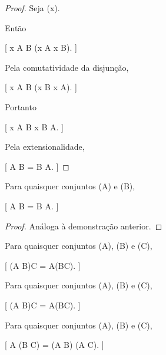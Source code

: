 \documentclass[../../main]{subfiles}
\begin{document}
\begin{proof}

	Seja (x).

	Então

	[
	x \in A \cup B
	\Leftrightarrow
	(x \in A \lor x \in B).
	]

	Pela comutatividade da disjunção,

	[
			x \in A \cup B
			\Leftrightarrow
			(x \in B \lor x \in A).
		]

	Portanto

		[
			x \in A \cup B
			\Leftrightarrow
			x \in B \cup A.
		]

	Pela extensionalidade,

	[
			A \cup B = B \cup A.
		]

\end{proof}

\begin{prop}

	Para quaisquer conjuntos (A) e (B),

	[
			A \cap B = B \cap A.
		]

\end{prop}

\begin{proof}

	Análoga à demonstração anterior.

\end{proof}

\begin{prop}

	Para quaisquer conjuntos (A), (B) e (C),

	[
			(A \cup B)\cup C
			=
			A\cup(B\cup C).
		]

\end{prop}

\begin{prop}

	Para quaisquer conjuntos (A), (B) e (C),

	[
			(A \cap B)\cap C
			=
			A\cap(B\cap C).
		]

\end{prop}

\begin{prop}

	Para quaisquer conjuntos (A), (B) e (C),

	[
			A \cup (B \cap C)
			=
			(A \cup B)
			\cap
			(A \cup C).
		]

\end{prop}
\end{document}
